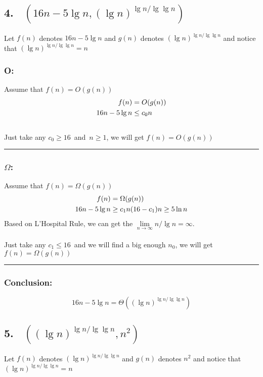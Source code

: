 \documentclass[oneside]{homework} %
\begin{document}
\subsection*{4. ~$(16n-5 \lg n,(\lg n)^{\lg n / \lg \lg n})$}
Let $f(n)$ denotes $16n-5 \lg n$ and $g(n)$ denotes $(\lg n)^{\lg n / \lg \lg n}$ and notice that $(\lg n)^{\lg n / \lg \lg n} = n$
\subsubsection* {O:}
Assume that $f(n) = O(g(n))$\\
\begin{equation}
\notag
\begin{aligned}[b]
f(n) &= O(g(n)) \\
16n-5 \lg n & \leq c_{0}n  
\end{aligned}
\end{equation}
\\ Just take any $ c_{0} \geq 16 $~and~$n\geq 1$, we will get $f(n) = O(g(n))$ 
\\ \rule{3mm}{3mm}

\subsubsection* {$\Omega$:}
Assume that $f(n) = \Omega (g(n))$\\
\begin{equation}
\notag
\begin{aligned}[b]
f(n) &= \Omega(g(n)) \\
16n-5 \lg n & \geq c_{1}n  
(16-c_{1})n \geq 5 \ln n
\end{aligned}
\end{equation}
Based on L'Hospital Rule, we can get the $\lim\limits_{n\to\infty} n / \lg  n  = \infty$.\\
\\ Just take any $ c_{1} \leq 16 $~and we will find a big enough $n_{0}$, we will get $f(n) = \Omega(g(n))$ 
\\ \rule{3mm}{3mm}

\subsubsection* {Conclusion:}
$$16n-5 \lg n = \Theta((\lg n)^{\lg n / \lg \lg n})$$

\subsection*{5. ~$((\lg n)^{\lg n / \lg \lg n},n^2)$}
Let $f(n)$ denotes $(\lg n)^{\lg n / \lg \lg n}$ and $g(n)$ denotes $n^2$ and notice that $(\lg n)^{\lg n / \lg \lg n} = n$
\end{document}

